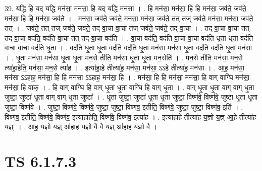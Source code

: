 \documentclass[17pt]{extarticle}
\begin{document}
39. यद्धि हि यद् यद्धि मन॑सा॒ मन॑सा॒ हि यद् यद्धि मन॑सा । . हि मन॑सा॒ मन॑सा॒ हि हि मन॑सा॒ जव॑ते॒ जव॑ते॒ मन॑सा॒ हि हि मन॑सा॒ जव॑ते । . मन॑सा॒ जव॑ते॒ जव॑ते॒ मन॑सा॒ मन॑सा॒ जव॑ते॒ तत् तज् जव॑ते॒ मन॑सा॒ मन॑सा॒ जव॑ते॒ तत् । . जव॑ते॒ तत् तज् जव॑ते॒ जव॑ते॒ तद् वा॒चा वा॒चा तज् जव॑ते॒ जव॑ते॒ तद् वा॒चा । . तद् वा॒चा वा॒चा तत् तद् वा॒चा वद॑ति॒ वद॑ति वा॒चा तत् तद् वा॒चा वद॑ति । . वा॒चा वद॑ति॒ वद॑ति वा॒चा वा॒चा वद॑ति धृ॒ता धृ॒ता वद॑ति वा॒चा वा॒चा वद॑ति धृ॒ता । . वद॑ति धृ॒ता धृ॒ता वद॑ति॒ वद॑ति धृ॒ता मन॑सा॒ मन॑सा धृ॒ता वद॑ति॒ वद॑ति धृ॒ता मन॑सा । . धृ॒ता मन॑सा॒ मन॑सा धृ॒ता धृ॒ता मन॒से तीति॒ मन॑सा धृ॒ता धृ॒ता मन॒सेति॑ । . मन॒से तीति॒ मन॑सा॒ मन॒से त्या॑हा॒हेति॒ मन॑सा॒ मन॒से त्या॑ह । . इत्या॑हा॒हे तीत्या॑ह॒ मन॑सा॒ मन॑सा॒ ऽऽहे तीत्या॑ह॒ मन॑सा । . आ॒ह॒ मन॑सा॒ मन॑सा ऽऽहाह॒ मन॑सा॒ हि हि मन॑सा ऽऽहाह॒ मन॑सा॒ हि । . मन॑सा॒ हि हि मन॑सा॒ मन॑सा॒ हि वाग् वाग्घि मन॑सा॒ मन॑सा॒ हि वाक् । . हि वाग् वाग्घि हि वाग् धृ॒ता धृ॒ता वाग्घि हि वाग् धृ॒ता । . वाग् धृ॒ता धृ॒ता वाग् वाग् धृ॒ता जुष्टा॒ जुष्टा॑ धृ॒ता वाग् वाग् धृ॒ता जुष्टा᳚ । . धृ॒ता जुष्टा॒ जुष्टा॑ धृ॒ता धृ॒ता जुष्टा॒ विष्ण॑वे॒ विष्ण॑वे॒ जुष्टा॑ धृ॒ता धृ॒ता जुष्टा॒ विष्ण॑वे । . जुष्टा॒ विष्ण॑वे॒ विष्ण॑वे॒ जुष्टा॒ जुष्टा॒ विष्ण॑व॒ इतीति॒ विष्ण॑वे॒ जुष्टा॒ जुष्टा॒ विष्ण॑व॒ इति॑ । . विष्ण॑व॒ इतीति॒ विष्ण॑वे॒ विष्ण॑व॒ इत्या॑हा॒हेति॒ विष्ण॑वे॒ विष्ण॑व॒ इत्या॑ह । . इत्या॑हा॒हे तीत्या॑ह य॒ज्ञो य॒ज्ञ् आ॒हे तीत्या॑ह य॒ज्ञ्ः । . आ॒ह॒ य॒ज्ञो य॒ज्ञ् आ॑हाह य॒ज्ञो वै वै य॒ज्ञ् आ॑हाह य॒ज्ञो वै । \newline
\pagebreak
{}

\section{ TS 6.1.7.3 }
\end{document}
